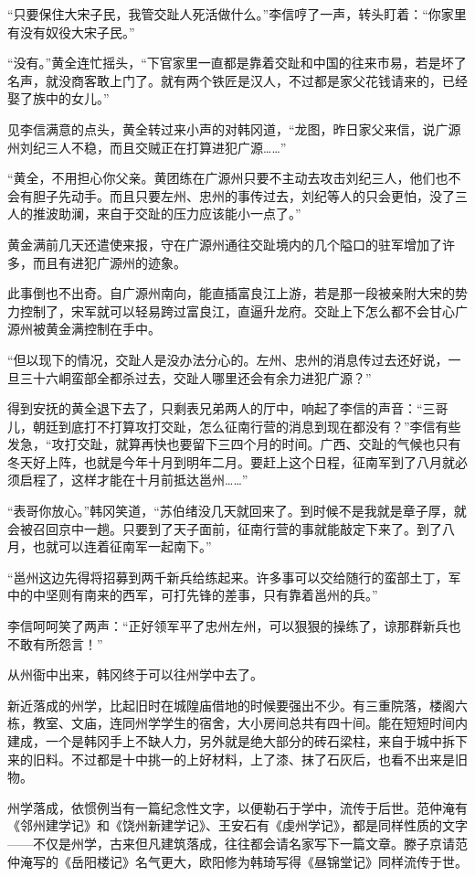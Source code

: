 “只要保住大宋子民，我管交趾人死活做什么。”李信哼了一声，转头盯着：“你家里有没有奴役大宋子民。”

“没有。”黄全连忙摇头，“下官家里一直都是靠着交趾和中国的往来市易，若是坏了名声，就没商客敢上门了。就有两个铁匠是汉人，不过都是家父花钱请来的，已经娶了族中的女儿。”

见李信满意的点头，黄全转过来小声的对韩冈道，“龙图，昨日家父来信，说广源州刘纪三人不稳，而且交贼正在打算进犯广源……”

“黄全，不用担心你父亲。黄团练在广源州只要不主动去攻击刘纪三人，他们也不会有胆子先动手。而且只要左州、忠州的事传过去，刘纪等人的只会更怕，没了三人的推波助澜，来自于交趾的压力应该能小一点了。”

黄金满前几天还遣使来报，守在广源州通往交趾境内的几个隘口的驻军增加了许多，而且有进犯广源州的迹象。

此事倒也不出奇。自广源州南向，能直插富良江上游，若是那一段被亲附大宋的势力控制了，宋军就可以轻易跨过富良江，直逼升龙府。交趾上下怎么都不会甘心广源州被黄金满控制在手中。

“但以现下的情况，交趾人是没办法分心的。左州、忠州的消息传过去还好说，一旦三十六峒蛮部全都杀过去，交趾人哪里还会有余力进犯广源？”

得到安抚的黄全退下去了，只剩表兄弟两人的厅中，响起了李信的声音：“三哥儿，朝廷到底打不打算攻打交趾，怎么征南行营的消息到现在都没有？”李信有些发急，“攻打交趾，就算再快也要留下三四个月的时间。广西、交趾的气候也只有冬天好上阵，也就是今年十月到明年二月。要赶上这个日程，征南军到了八月就必须启程了，这样才能在十月前抵达邕州……”

“表哥你放心。”韩冈笑道，“苏伯绪没几天就回来了。到时候不是我就是章子厚，就会被召回京中一趟。只要到了天子面前，征南行营的事就能敲定下来了。到了八月，也就可以连着征南军一起南下。”

“邕州这边先得将招募到两千新兵给练起来。许多事可以交给随行的蛮部土丁，军中的中坚则有南来的西军，可打先锋的差事，只有靠着邕州的兵。”

李信呵呵笑了两声：“正好领军平了忠州左州，可以狠狠的操练了，谅那群新兵也不敢有所怨言！”

从州衙中出来，韩冈终于可以往州学中去了。

新近落成的州学，比起旧时在城隍庙借地的时候要强出不少。有三重院落，楼阁六栋，教室、文庙，连同州学学生的宿舍，大小房间总共有四十间。能在短短时间内建成，一个是韩冈手上不缺人力，另外就是绝大部分的砖石梁柱，来自于城中拆下来的旧料。不过都是十中挑一的上好材料，上了漆、抹了石灰后，也看不出来是旧物。

州学落成，依惯例当有一篇纪念性文字，以便勒石于学中，流传于后世。范仲淹有《邻州建学记》和《饶州新建学记》、王安石有《虔州学记》，都是同样性质的文字——不仅是州学，古来但凡建筑落成，往往都会请名家写下一篇文章。滕子京请范仲淹写的《岳阳楼记》名气更大，欧阳修为韩琦写得《昼锦堂记》同样流传于世。

